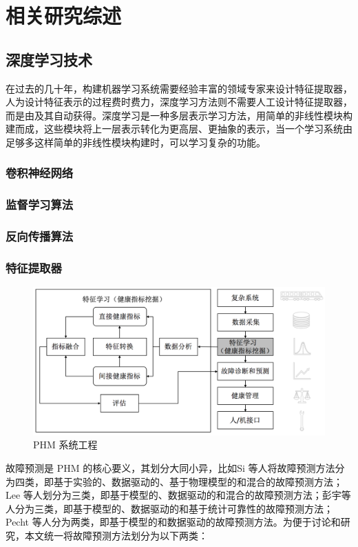 \chapter{相关研究综述}
\label{cha:review}

\section{深度学习技术}
\label{sec:review-deeplearning}
在过去的几十年，构建机器学习系统需要经验丰富的领域专家来设计特征提取器，人为设计特征表示的过程费时费力，深度学习方法则不需要人工设计特征提取器，而是由及其自动获得。深度学习是一种多层表示学习方法，用简单的非线性模块构建而成，这些模块将上一层表示转化为更高层、更抽象的表示，当一个学习系统由足够多这样简单的非线性模块构建时，可以学习复杂的功能。
\subsection{卷积神经网络}

\subsection{监督学习算法}
\subsection{反向传播算法}
\subsection{特征提取器}

\begin{figure}[H]
\centering
\includegraphics[scale=0.5]{figures/phm-framework.png}
\caption{PHM 系统工程}
\label{fig:phm-framework}
\end{figure}
故障预测是 PHM 的核心要义，其划分大同小异，比如Si 等人将故障预测方法分为四类，即基于实验的、数据驱动的、基于物理模型的和混合的故障预测方法\cite{si2011remaining}；Lee 等人划分为三类，即基于模型的、数据驱动的和混合的故障预测方法\cite{lee2014prognostics}；彭宇等人分为三类，即基于模型的、数据驱动的和基于统计可靠性的故障预测方法\cite{彭宇2010故障预测与健康管理技术综述}；Pecht 等人分为两类，即基于模型的和数据驱动的故障预测方法\cite{pecht2010prognostics}。为便于讨论和研究，本文统一将故障预测方法划分为以下两类：

